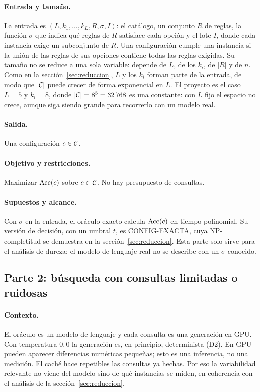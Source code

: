 \paragraph{Entrada y tamaño.} La entrada es $(L,k_1,\dots,k_L,R,\sigma,I)$: el catálogo,
un conjunto $R$ de reglas, la función $\sigma$ que indica qué reglas de $R$ satisface cada
opción y el lote $I$, donde cada instancia exige un subconjunto de $R$. Una configuración
cumple una instancia si la unión de las reglas de sus opciones contiene todas las reglas
exigidas. Su tamaño no se reduce a una sola variable: depende de $L$, de los $k_i$, de
$|R|$ y de $n$. Como en la
sección~\ref{sec:reduccion}, $L$ y los $k_i$ forman parte de la entrada, de modo que
$|\mathcal{C}|$ puede crecer de forma exponencial en $L$. El proyecto es el caso $L=5$ y $k_i=8$,
donde $|\mathcal{C}|=8^5=32\,768$ es una constante: con $L$ fijo el espacio no crece, aunque
siga siendo grande para recorrerlo con un modelo real.

\paragraph{Salida.} Una configuración $c\in\mathcal{C}$.

\paragraph{Objetivo y restricciones.} Maximizar $\operatorname{Acc}(c)$ sobre $c\in\mathcal{C}$. No hay
presupuesto de consultas.

\paragraph{Supuestos y alcance.} Con $\sigma$ en la entrada, el oráculo exacto calcula
$\operatorname{Acc}(c)$ en tiempo polinomial. Su versión de decisión, con un umbral $t$, es
CONFIG-EXACTA, cuya NP-completitud se demuestra en la sección~\ref{sec:reduccion}. Esta
parte solo sirve para el análisis de dureza: el modelo de lenguaje real no se describe con
un $\sigma$ conocido.

\subsection{Parte 2: búsqueda con consultas limitadas o ruidosas}

\paragraph{Contexto.} El oráculo es un modelo de lenguaje y cada consulta es una
generación en GPU. Con temperatura $0{,}0$ la generación es, en principio, determinista
(D2). En GPU pueden aparecer diferencias numéricas pequeñas; esto es una inferencia, no
una medición. El caché hace repetibles las consultas ya hechas. Por eso la variabilidad
relevante no viene del modelo sino de qué instancias se miden, en coherencia con el
análisis de la sección~\ref{sec:reduccion}.

